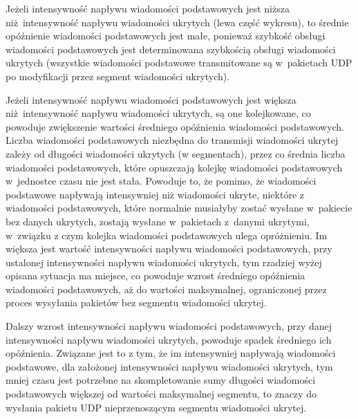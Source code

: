 \documentclass[a4paper, twoside, 12pt]{report}
\begin{document}
            Jeżeli intensywność napływu wiadomości podstawowych
            jest niższa niż intensywność napływu wiadomości ukrytych (lewa część wykresu),
            to średnie opóźnienie wiadomości
            podstawowych jest małe, ponieważ szybkość obsługi wiadomości podstawowych jest
            determinowana szybkością obsługi wiadomości ukrytych (wszystkie wiadomości podstawowe transmitowane
            są w~pakietach UDP po modyfikacji przez segment wiadomości ukrytych).

            Jeżeli intensywność napływu wiadomości
            podstawowych jest większa niż intensywność napływu wiadomości ukrytych, są one kolejkowane,
            co powoduje zwiększenie wartości średniego opóźnienia wiadomości podstawowych.
            Liczba wiadomości podstawowych niezbędna do transmisji wiadomości ukrytej
            zależy od długości wiadomości ukrytych (w segmentach),
            przez co średnia liczba wiadomości podstawowych, które opuszczają kolejkę wiadomości
            podstawowych w~jednostce czasu nie jest stała. Powoduje to, że pomimo,
            że wiadomości podstawowe napływają intensywniej niż wiadomości ukryte,
            niektóre z wiadomości podstawowych, które normalnie musiałyby zostać
            wysłane w~pakiecie bez danych ukrytych, zostają wysłane w~pakietach
            z~danymi ukrytymi, w~związku z czym kolejka wiadomości podstawowych
            ulega opróżnieniu. Im większa jest wartość intensywności napływu wiadomości
            podstawowych, przy ustalonej intensywności napływu wiadomości ukrytych,
            tym rzadziej wyżej opisana sytuacja ma miejsce, co powoduje
            wzrost średniego opóźnienia wiadomości podstawowych, aż do wartości
            maksymalnej, ograniczonej przez proces wysyłania pakietów bez segmentu wiadomości ukrytej.

            Dalszy wzrost intensywności napływu wiadomości podstawowych, przy danej
            intensywności napływu wiadomości ukrytych, powoduje
            spadek średniego ich opóźnienia. Związane jest to z tym, że im intensywniej
            napływają wiadomości podstawowe, dla założonej intensywności napływu wiadomości
            ukrytych, tym mniej czasu jest potrzebne na skompletowanie sumy długości
            wiadomości podstawowych większej od wartości maksymalnej segmentu, to znaczy
            do wysłania pakietu UDP nieprzenoszącym segmentu wiadomości ukrytej.
\end{document}
